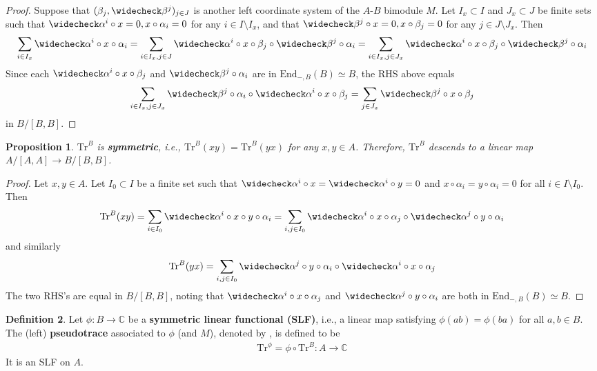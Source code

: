 \documentclass[11pt,b5paper,notitlepage]{article}
\theoremstyle{definition}
\newtheorem{df}{Definition}[section]
\theoremstyle{plain}
\newtheorem{pp}[df]{Proposition}
\newcommand{\wch}{\widecheck}
\newcommand{\Tr}{\mathrm{Tr}}
\newcommand{\End}{\mathrm{End}} %
\newcommand{\Cbb}{\mathbb C}
\numberwithin{equation}{section}
\begin{document}
\begin{proof}
Suppose that $(\beta_j,\wch\beta^j)_{j\in J}$ is another left coordinate system of the $A$-$B$ bimodule $M$. Let $I_x\subset I$ and $J_x\subset J$ be finite sets such that $\wch\alpha^i\circ x=0,x\circ\alpha_i=0$ for any $i\in I\setminus I_x$, and that $\wch\beta^j\circ x=0,x\circ\beta_j=0$ for any $j\in J\setminus J_x$. Then
\begin{align*}
\sum_{i\in I_x}\wch\alpha^i\circ x\circ\alpha_i=\sum_{i\in I_x,j\in J}\wch\alpha^i\circ x\circ \beta_j\circ\wch\beta^j\circ\alpha_i=\sum_{i\in I_x,j\in J_x}\wch\alpha^i\circ x\circ \beta_j\circ\wch\beta^j\circ\alpha_i
\end{align*}
Since each $\wch\alpha^i\circ x\circ \beta_j$ and $\wch\beta^j\circ\alpha_i$ are in $\End_{-,B}(B)\simeq B$, the RHS above equals
\begin{align*}
\sum_{i\in I_x,j\in J_x}\wch\beta^j\circ\alpha_i\circ\wch\alpha^i\circ x\circ \beta_j=\sum_{j\in J_x}\wch\beta^j\circ x\circ \beta_j
\end{align*}
in $B/[B,B]$.
\end{proof}






\begin{pp}\label{lb37}
$\Tr^B$ is \textbf{symmetric}, i.e., $\Tr^B(xy)=\Tr^B(yx)$ for any $x,y\in A$. Therefore, $\Tr^B$ descends to a linear map $A/[A,A]\rightarrow B/[B,B]$.
\end{pp}




\begin{proof}
Let $x,y\in A$. Let $I_0\subset I$ be a finite set such that $\wch\alpha^i\circ x=\wch\alpha^i\circ y=0$ and $x\circ\alpha_i=y\circ\alpha_i=0$ for all $i\in I\setminus I_0$. Then
\begin{align*}
\Tr^B(xy)=\sum_{i\in I_0}\wch\alpha^i\circ x\circ y\circ\alpha_i=\sum_{i,j\in I_0}\wch\alpha^i\circ x\circ\alpha_j\circ\wch\alpha^j\circ y\circ\alpha_i
\end{align*}
and similarly
\begin{align*}
\Tr^B(yx)=\sum_{i,j\in I_0}\wch\alpha^j\circ y\circ\alpha_i\circ\wch\alpha^i\circ x\circ\alpha_j
\end{align*}
The two RHS's are equal in $B/[B,B]$, noting that $\wch\alpha^i\circ x\circ\alpha_j$ and $\wch\alpha^j\circ y\circ\alpha_i$ are both in $\End_{-,B}(B)\simeq B$.
\end{proof}


\begin{df}
Let $\phi:B\rightarrow\Cbb$ be a \textbf{symmetric linear functional (SLF)}, i.e., a linear map satisfying $\phi(ab)=\phi(ba)$ for all $a,b\in B$. The (left) \textbf{pseudotrace} associated to $\phi$ (and $M$), denoted by \pmb{$\Tr^\phi$}, is defined to be
\begin{align}
\Tr^\phi=\phi\circ\Tr^B:A\rightarrow\Cbb
\end{align}
It is an SLF on $A$.
\end{df}
\end{document}
